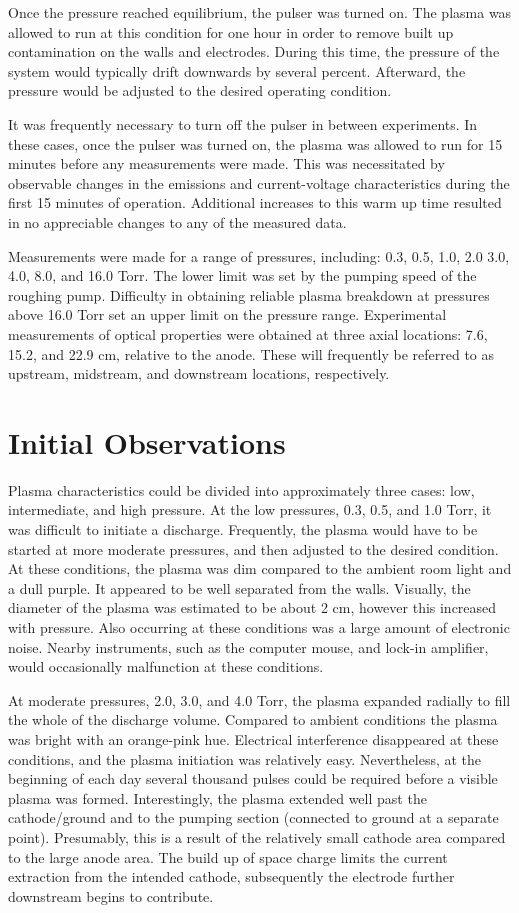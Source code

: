 Once the pressure reached equilibrium, the pulser was turned on. The plasma was
allowed to run at this condition for one hour in order to remove built up
contamination on the walls and electrodes. During this time, the pressure of the
system would typically drift downwards by several percent. Afterward, the
pressure would be adjusted to the desired operating condition.

It was frequently necessary to turn off the pulser in between experiments. In
these cases, once the pulser was turned on, the plasma was allowed to run for 15
minutes before any measurements were made. This was necessitated by observable
changes in the emissions and current-voltage characteristics during the first 15
minutes of operation. Additional increases to this warm up time resulted in no
appreciable changes to any of the measured data.

Measurements were made for a range of pressures, including: 0.3, 0.5, 1.0, 2.0
3.0, 4.0, 8.0, and 16.0 Torr. The lower limit was set by the pumping speed of
the roughing pump. Difficulty in obtaining reliable plasma breakdown at
pressures above 16.0 Torr set an upper limit on the pressure range. Experimental
measurements of optical properties were obtained at three axial locations: 7.6,
15.2, and 22.9 cm, relative to the anode. These will frequently be referred to
as upstream, midstream, and downstream locations, respectively.

\section{Initial Observations}

Plasma characteristics could be divided into approximately three cases: low,
intermediate, and high pressure. At the low pressures, 0.3, 0.5, and 1.0 Torr,
it was difficult to initiate a discharge. Frequently, the plasma would have to
be started at more moderate pressures, and then adjusted to the desired
condition. At these conditions, the plasma was dim compared to the ambient room
light and a dull purple. It appeared to be well separated from the walls.
Visually, the diameter of the plasma was estimated to be about 2 cm, however
this increased with pressure. Also occurring at these conditions was a large
amount of electronic noise. Nearby instruments, such as the computer mouse, and
lock-in amplifier, would occasionally malfunction at these conditions.

At moderate pressures, 2.0, 3.0, and 4.0 Torr, the plasma expanded radially to
fill the whole of the discharge volume. Compared to ambient conditions the
plasma was bright with an orange-pink hue. Electrical interference disappeared
at these conditions, and the plasma initiation was relatively easy.
Nevertheless, at the beginning of each day several thousand pulses could be
required before a visible plasma was formed. Interestingly, the plasma extended
well past the cathode/ground and to the pumping section (connected to ground at
a separate point). Presumably, this is a result of the relatively small cathode
area compared to the large anode area. The build up of space charge limits the
current extraction from the intended cathode, subsequently the electrode further
downstream begins to contribute.

